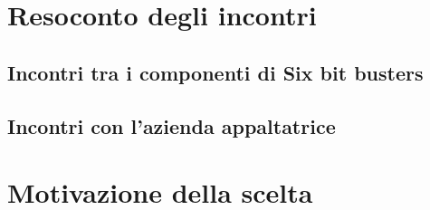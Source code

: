 \section{Resoconto degli incontri}
\subsection{Incontri tra i componenti di Six bit busters}

\subsection{Incontri con l'azienda appaltatrice}

\section{Motivazione della scelta}